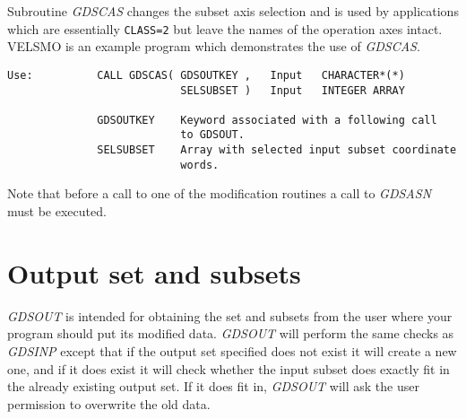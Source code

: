 Subroutine {\sl GDSCAS\/} changes the subset axis selection and is used
by applications which are essentially {\tt CLASS=2} but leave the names
of the operation axes intact. VELSMO is an example program which
demonstrates the use of {\sl GDSCAS\/}.

\begin{verbatim}
Use:          CALL GDSCAS( GDSOUTKEY ,   Input   CHARACTER*(*)
                           SELSUBSET )   Input   INTEGER ARRAY

              GDSOUTKEY    Keyword associated with a following call
                           to GDSOUT.
              SELSUBSET    Array with selected input subset coordinate
                           words.
\end{verbatim}

Note that before a call to one of the modification routines a call to
{\sl GDSASN\/} must be executed.

\section{Output set and subsets}

{\sl GDSOUT\/} is intended for obtaining the set and subsets from the
user where your program should put its modified data.  {\sl GDSOUT\/}
will perform the same checks as {\sl GDSINP\/} except that if the output
set specified does not exist it will create a new one, and if it does
exist it will check whether the input subset does exactly fit in the
already existing output set.  If it does fit in, {\sl GDSOUT\/} will ask
the user permission to overwrite the old data.

